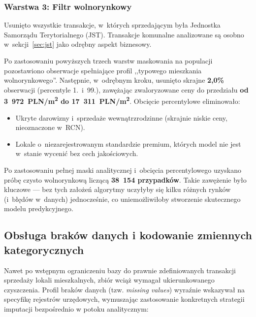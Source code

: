 \documentclass[12pt,a4paper]{article}
\begin{document}
\subsubsection*{Warstwa 3: Filtr wolnorynkowy}
Usunięto wszystkie transakcje, w~których sprzedającym była Jednostka Samorządu Terytorialnego (JST). Transakcje komunalne analizowane są osobno w~sekcji~\ref{sec:jst} jako odrębny aspekt biznesowy.

\medskip
Po zastosowaniu powyższych trzech warstw maskowania na populacji pozostawiono obserwacje spełniające profil ,,typowego mieszkania wolnorynkowego''. Następnie, w~odrębnym kroku, usunięto skrajne \textbf{2,0\%} obserwacji (percentyle 1.\ i~99.), zawężając zwaloryzowane ceny do przedziału \textbf{od 3~972~PLN/m\textsuperscript{2} do 17~311~PLN/m\textsuperscript{2}}. Obcięcie percentylowe eliminowało:
\begin{itemize}
    \item Ukryte darowizny i~sprzedaże wewnątrzrodzinne (skrajnie niskie ceny, nieoznaczone w~RCN).
    \item Lokale o~niezarejestrowanym standardzie premium, których model nie jest w~stanie wycenić bez cech jakościowych.
\end{itemize}
Po zastosowaniu pełnej maski analitycznej i~obcięcia percentylowego uzyskano próbę czysto wolnorynkową liczącą \textbf{38~154 przypadków}. Takie zawężenie było kluczowe --- bez tych założeń algorytmy uczyłyby się kilku różnych rynków (i~błędów w~danych) jednocześnie, co uniemożliwiłoby stworzenie skutecznego modelu predykcyjnego.

\subsection{Obsługa braków danych i kodowanie zmiennych kategorycznych}

Nawet po wstępnym ograniczeniu bazy do prawnie zdefiniowanych transakcji sprzedaży lokali mieszkalnych, zbiór wciąż wymagał ukierunkowanego czyszczenia.
Profil braków danych (tzw. \textit{missing values}) wyraźnie wskazywał na specyfikę rejestrów urzędowych, wymuszając zastosowanie konkretnych strategii imputacji bezpośrednio w potoku analitycznym:
\end{document}
